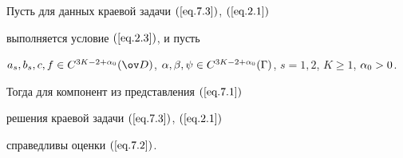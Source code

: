 \begin{thms} \label{t.7.2}


Пусть для данных краевой задачи $(\ref{eq.7.3})$, $(\ref{eq.2.1})$


выполняется условие $(\ref{eq.2.3})$, и пусть


$a_s,b_s,c,f \in C^{3K-2+\al_0}(\od)$, $\al,\beta,\psi \in


C^{3K-2+\al_0}(\G)$, $s=1,2$, $K \geq 1$, $\al_0 >0$. 


Тогда для компонент из представления $(\ref{eq.7.1})$


решения краевой задачи $(\ref{eq.7.3})$, $(\ref{eq.2.1})$


справедливы оценки $(\ref{eq.7.2})$.


\end{thms}





